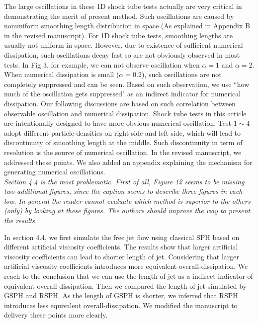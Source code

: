 \documentclass[10pt,a4paper]{article}
\begin{document}
The large oscillations in these 1D shock tube tests actually are very critical in demonstrating the merit of present method. Such oscillations are caused by nonuniform smoothing length distribution in space (As explained in Appendix B in the revised manuscript). For 1D shock tube tests, smoothing lengths are usually not uniform in space. However, due to existence of sufficient numerical dissipation, such oscillations decay fast so are not obviously observed in most tests. In Fig 3, for example, we can not observe oscillation when $\alpha =1$ and $\alpha = 2$. When numerical dissipation is small ($\alpha = 0.2$), such oscillations are not completely suppressed and can be seen. Based on such observation, we use ``how much of the oscillation gets suppressed" as an indirect indicator for numerical dissipation. Our following discussions are based on such correlation between observable oscillation and numerical dissipation. Shock tube tests in this article are intentionally designed to have more obvious numerical oscillation. Test $1 \sim 4$ adopt different particle densities on right side and left side, which will lead to discontinuity of smoothing length at the middle. Such discontinuity in term of resolution is the source of numerical oscillation. In the revised manuscript, we addressed these points. We also added an appendix explaining the mechanism for generating numerical oscillations.
\\[3pt]

\textit{Section 4.4 is the most problematic. First of all, Figure 12 seems to be missing two additional figures, since the caption seems to describe three figures in each low. In general the reader cannot evaluate which method is superior to the others (only) by looking at these figures. The authors should improve the way to present the results.} 

In section 4.4, we first simulate the free jet flow using classical SPH based on different artificial viscosity coefficients. The results show that larger artificial viscosity coefficients can lead to shorter length of jet. Considering that larger artificial viscosity coefficients introduces more equivalent overall-dissipation. We reach to the conclusion that we can use the length of jet as a indirect indicator of equivalent overall-dissipation. 
Then we compared the length of jet simulated by GSPH and RSPH. As the length of GSPH is shorter, we inferred that RSPH introduces less equivalent overall-dissipation.
We modified the manuscript to delivery these points more clearly.
 
\end{document}

